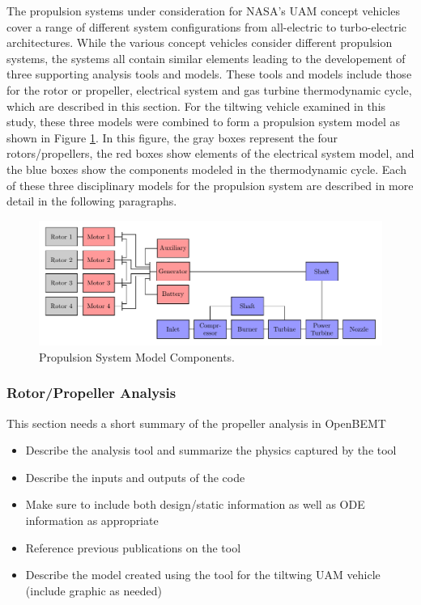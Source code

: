 
The propulsion systems under consideration for NASA's UAM concept vehicles cover a range of different system configurations from all-electric to turbo-electric architectures.
While the various concept vehicles consider different propulsion systems, the systems all contain similar elements leading to the developement of three supporting analysis tools and models.
These tools and models include those for the rotor or propeller, electrical system and gas turbine thermodynamic cycle, which are described in this section.  
For the tiltwing vehicle examined in this study, these three models were combined to form a propulsion system model as shown in Figure \ref{f:turboelectric}. 
In this figure, the gray boxes represent the four rotors/propellers, the red boxes show elements of the electrical system model, and the blue boxes show the components modeled in the thermodynamic cycle.
Each of these three disciplinary models for the propulsion system are described in more detail in the following paragraphs.


\begin{figure}[htb]
\begin{center}
 \includegraphics[width=1.0\textwidth]{../Images/Propulsion_system.pdf}
 \caption{Propulsion System Model Components.}
 \label{f:turboelectric}
\end{center}
\end{figure}

\subsubsection{Rotor/Propeller Analysis} %
This section needs a short summary of the propeller analysis in OpenBEMT
\begin{itemize}
    \item Describe the analysis tool and summarize the physics captured by the tool
    \item Describe the inputs and outputs of the code
    \item Make sure to include both design/static information as well as ODE information as appropriate
    \item Reference previous publications on the tool
    \item Describe the model created using the tool for the tiltwing UAM vehicle (include graphic as needed)
\end{itemize}

